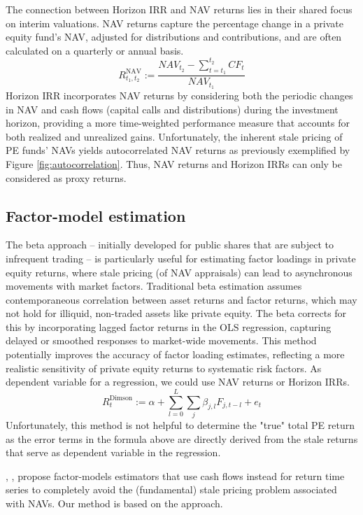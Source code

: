 The connection between Horizon IRR and NAV returns lies in their shared focus on interim valuations. 
NAV returns capture the percentage change in a private equity fund's NAV, adjusted for distributions and contributions, and are often calculated on a quarterly or annual basis. 
\[
R_{t_1, t_2}^{\mathrm{NAV}} := \frac{{NAV}_{t_2} - \sum_{t=t_1}^{t_2} {CF}_t }{{NAV}_{t_1}}
\]
Horizon IRR incorporates NAV returns by considering both the periodic changes in NAV and cash flows (capital calls and distributions) during the investment horizon, providing a more time-weighted performance measure that accounts for both realized and unrealized gains. 
Unfortunately, the inherent stale pricing of PE funds' NAVs yields autocorrelated NAV returns as previously exemplified by Figure \ref{fig:autocorrelation}.
Thus, NAV returns and Horizon IRRs can only be considered as proxy returns.

	
\subsection{Factor-model estimation}

The \cite{dimson1979risk} beta approach -- initially developed for public shares that are subject to infrequent trading -- is particularly useful for estimating factor loadings in private equity returns, where stale pricing (of NAV appraisals) can lead to asynchronous movements with market factors. 
Traditional beta estimation assumes contemporaneous correlation between asset returns and factor returns, which may not hold for illiquid, non-traded assets like private equity. 
The \cite{dimson1979risk} beta corrects for this by incorporating lagged factor returns in the OLS regression, capturing delayed or smoothed responses to market-wide movements. 
This method potentially improves the accuracy of factor loading estimates, reflecting a more realistic sensitivity of private equity returns to systematic risk factors.
As dependent variable for a \cite{dimson1979risk} regression, we could use NAV returns or Horizon IRRs.
\[
R_t^{\mathrm{Dimson}} := 
\alpha + \sum_{l=0}^L \sum_j \beta_{j,l} F_{j,t-l} + e_{t}
\]
Unfortunately, this method is not helpful to determine the "true" total PE return as the error terms in the formula above are directly derived from the stale returns that serve as dependent variable in the regression. 

\cite{DLP12}, \cite{KN16}, \cite{ACGP18} propose factor-models estimators that use cash flows instead for return time series to completely avoid the (fundamental) stale pricing problem associated with NAVs.
Our method is based on the \cite{DLP12} approach.


